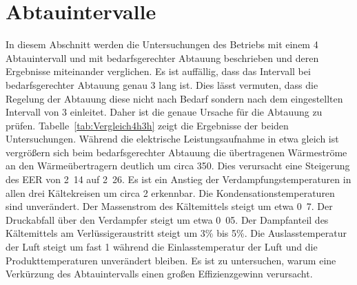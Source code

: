 \section{Abtauintervalle}
\label{sec:Abtauintervalle}

In diesem Abschnitt werden die Untersuchungen des Betriebs mit einem \unit{4}{\hour} Abtauintervall und mit bedarfsgerechter Abtauung beschrieben und deren Ergebnisse miteinander verglichen. 
Es ist auffällig, dass das Intervall bei bedarfsgerechter Abtauung genau \unit{3}{\hour} lang ist. Dies lässt vermuten, dass die Regelung der Abtauung diese nicht nach Bedarf sondern nach dem eingestellten Intervall von \unit{3}{\hour} einleitet. Daher ist die genaue Ursache für die Abtauung zu prüfen. \newline
Tabelle~\ref{tab:Vergleich4h3h} zeigt die Ergebnisse der beiden Untersuchungen.
Während die elektrische Leistungsaufnahme in etwa gleich ist vergrößern sich beim bedarfsgerechter Abtauung die übertragenen Wärmeströme an den Wärmeübertragern deutlich um circa \unit{350}{\watt}. Dies verursacht eine Steigerung des EER von \unit{2.14}{} auf \unit{2.26}{}.
Es ist ein Anstieg der Verdampfungstemperaturen in allen drei Kältekreisen um circa \unit{2}{\kelvin} erkennbar. Die Kondensationstemperaturen sind unverändert. Der Massenstrom des Kältemittels steigt um etwa \unit{0.7}{\gram\per\second}. Der Druckabfall über den Verdampfer steigt um etwa \unit{0.05}{\bbar}. Der Dampfanteil des Kältemittels am Verlüssigeraustritt steigt um \unit{3}{\%} bis \unit{5}{\%}. Die Auslasstemperatur der Luft steigt um fast \unit{1}{\kelvin} während die Einlasstemperatur der Luft und die Produkttemperaturen unverändert bleiben. \newline
Es ist zu untersuchen, warum eine Verkürzung des Abtauintervalls einen großen Effizienzgewinn verursacht.

 


